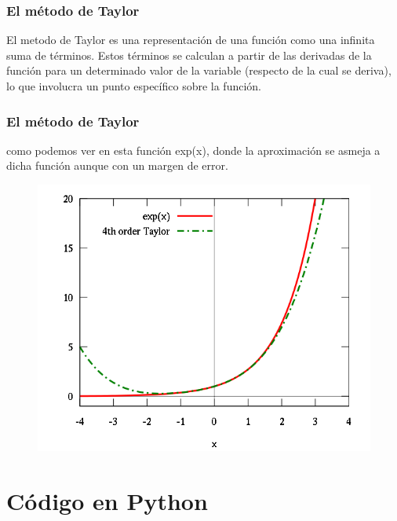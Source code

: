\documentclass{beamer}
\begin{document}
\begin{frame}
\frametitle{El método de Taylor}
El metodo de Taylor es una representación de una función como una infinita suma de términos.
Estos términos se calculan a partir de las derivadas de la función para un determinado valor de la variable (respecto de la cual se deriva), lo que involucra un punto específico sobre la función.
\end {frame}
\begin{frame}
\frametitle{El método de Taylor} 
como podemos ver en esta función exp(x), donde la aproximación se asmeja a dicha función aunque con un margen de error.
\begin{figure}[b]
\begin{center}
\includegraphics[scale=0.4]{taylor.png}
\end{center}
\end{figure}
\end{frame}

\section{Código en Python}
\end{document}
